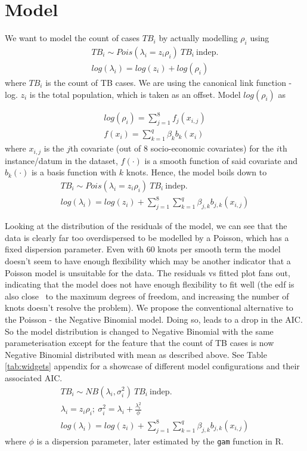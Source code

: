 \section{Model}
We want to model the count of cases $TB_i$ by actually modelling $\rho_i$ using
$$
\begin{aligned}
	TB_i \sim Pois(\lambda_i = z_i \rho_i) \ TB_i\  \mathrm{indep.} 
	\\
	log(\lambda_i) = log(z_i) + log(\rho_i)
\end{aligned}
$$
where $TB_i$ is the count of TB cases. We are using the canonical link function - log. $z_i$ is the total population, which is taken as an offset. Model $log(\rho_i)$ as

$$
\begin{aligned}
	log(\rho_i) = \sum_{j=1}^{8}f_{j}(x_{i,j})
	\\
	f(x_i) = \sum_{k=1}^{q}\beta_{k}b_{k}(x_i)
\end{aligned}
$$
where $x_{i,j}$ is the $j$th covariate (out of 8 socio-economic covariates) for the $i$th instance/datum in the dataset, $f(\cdot)$ is a smooth function of said covariate and $b_k(\cdot)$ is a basis function with $k$ knots. Hence, the model boils down to
$$
\begin{aligned}
	TB_i \sim Pois(\lambda_i = z_i \rho_i) \ TB_i\  \mathrm{indep.} 
	\\
	log(\lambda_i) = log(z_i) +  \sum_{j=1}^{8}\sum_{k=1}^{q}\beta_{j,k}b_{j,k}(x_{i,j})
\end{aligned}
$$

Looking at the distribution of the residuals of the model, we can see that the data is clearly far too overdispersed to be modelled by a Poisson, which has a fixed dispersion parameter. Even with 60 knots per smooth term the model doesn't seem to have enough flexibility which may be another indicator that a Poisson model is unsuitable for the data. The residuals vs fitted plot fans out, indicating that the model does not have enough flexibility to fit well (the edf is also close  to the maximum degrees of freedom, and increasing the number of knots doesn't resolve the problem). We propose the conventional alternative to the Poisson - the Negative Binomial model. Doing so, leads to a drop in the AIC. So the model distribution is changed to Negative Binomial with the same parameterisation except for
the feature that the count of TB cases is now Negative Binomial distributed with mean as described above.
See Table \ref{tab:widgets} appendix for a showcase of different model configurations and their associated AIC.
$$
\begin{aligned}
	TB_i \sim NB(\lambda_i , \sigma_i^2) \ TB_i\  \mathrm{indep.} 
	\\
	\lambda_i = z_i \rho_i ;\ \sigma_i^2 = \lambda_i +\frac{\lambda_i^2}{\phi}
	\\
	log(\lambda_i) = log(z_i) +  \sum_{j=1}^{8}\sum_{k=1}^{q}\beta_{j,k}b_{j,k}(x_{i,j})
\end{aligned}
$$
where $\phi$ is a dispersion parameter, later estimated by  the  \texttt{gam} function in R.


